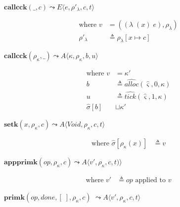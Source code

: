 \documentclass[12pt,draft]{article}
\newcommand{\singlelamsyn}[2]{(\lambda\;(#1)\;#2)}
\begin{document}
\begin{multicols*}{2}
\begin{center}
  $\textbf{callcck}(\_ , c)
  \leadsto E\langle e , \rho'_\lambda , c , t \rangle$
\end{center}
\vspace{-7mm}
\begin{align*}
\text{where } v &= (\singlelamsyn{x}{e} , \rho_{\lambda}) \\
\rho'_{\lambda} &\triangleq \rho_{\lambda}[x \mapsto c]
\end{align*}
\begin{center}
  $\textbf{callcck}(\rho_\kappa , \_)
  \leadsto A\langle \kappa , \rho_\kappa , b  , u \rangle$
\end{center}
\vspace{-7mm}
\begin{align*}
\text{where } v &= \kappa' \\
b &\triangleq \widehat{alloc}(\hat{\varsigma}, 0, \kappa) \\
u &\triangleq \widehat{tick}(\hat{\varsigma}, 1, \kappa) \\
\hat{\sigma}[b] &\sqcup \kappa'
\end{align*}
\begin{center}
  $\textbf{setk}(x, \rho_\kappa, c)
  \leadsto A\langle \textit{Void}, \rho_\kappa , c , t \rangle$
\end{center}
\vspace{-7mm}
\begin{align*}
\text{where } \hat{\sigma}[\rho_{\kappa}(x)] &\triangleq v
\end{align*}
\begin{center}
  $\textbf{appprimk}(op, \rho_\kappa, c)
  \leadsto A\langle v' , \rho_\kappa, c , t) \rangle$
\end{center}
\vspace{-7mm}
\begin{align*}
\text{where } v' &\triangleq op \text{ applied to } v
\end{align*}
\begin{center}
  $\textbf{primk}(op, done, [\;], \rho_\kappa, c)$
  $\leadsto A\langle v' , \rho_\kappa , c , t \rangle$
\end{center}
\vspace{-7mm}

\end{multicols*}
\end{document}
